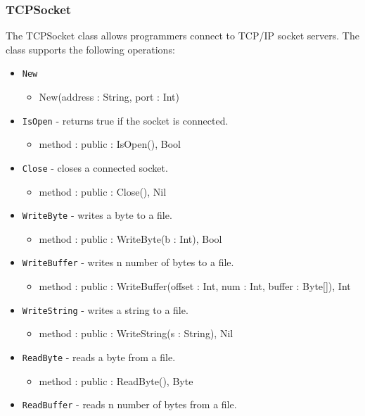 \documentclass[12pt]{article}
\begin{document}
\subsubsection{TCPSocket}
The TCPSocket class allows programmers connect to TCP/IP socket servers.    The class supports the following operations:
\begin{itemize}
    \item \texttt{New}
    	\begin{itemize}
	\item New(address : String, port : Int)
	\end{itemize}
    \item \texttt{IsOpen} - returns true if the socket is connected.
    	\begin{itemize}
	\item method : public : IsOpen(), Bool
	\end{itemize}
    \item \texttt{Close} - closes a connected socket.
    	\begin{itemize}
	\item method : public : Close(), Nil
	\end{itemize}
    \item \texttt{WriteByte} - writes a byte to a file.
    	\begin{itemize}
	\item method : public : WriteByte(b : Int), Bool
	\end{itemize}
    \item \texttt{WriteBuffer} - writes n number of bytes to a file.
    	\begin{itemize}
	\item method : public : WriteBuffer(offset : Int, num : Int, buffer : Byte[]), Int
	\end{itemize}
    \item \texttt{WriteString} - writes a string to a file.
    	\begin{itemize}
	\item method : public : WriteString(s : String), Nil
	\end{itemize}
    \item \texttt{ReadByte} - reads a byte from a file.
    	\begin{itemize}
	\item method : public : ReadByte(), Byte
	\end{itemize}
    \item \texttt{ReadBuffer} - reads n number of bytes from a file.
    	\begin{itemize}

\end{itemize}
\end{itemize}
\end{document}
